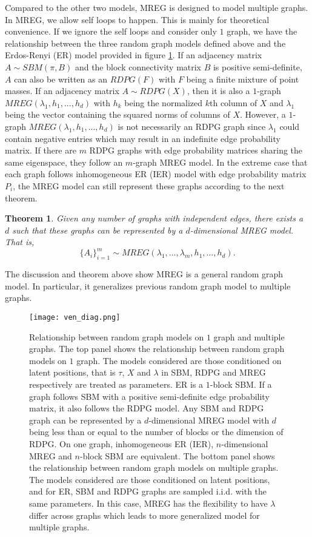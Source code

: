 \documentclass[10pt,journal,compsoc]{IEEEtran}
\newtheorem{theorem}{Theorem}[section]
\begin{document}
\noindent Compared to the other two models, MREG is designed to model multiple graphs. In MREG, we allow self loops to happen. This is mainly for theoretical convenience. If we ignore the self loops and consider only $1$ graph, we have the relationship between the three random graph models defined above and the Erdos-Renyi (ER) model provided in figure \ref{fig:ven}. If an adjacency matrix $A \sim SBM(\pi,B)$ and the block connectivity matrix $B$ is positive semi-definite, $A$ can also be written as an $RDPG(F)$ with $F$ being a finite mixture of point masses. If an adjacency matrix $A \sim RDPG(X)$, then it is also a $1$-graph $MREG(\lambda_1,h_1,...,h_d)$ with $h_k$ being the normalized $k$th column of $X$ and $\lambda_1$ being the vector containing the squared norms of columns of $X$. However, a $1$-graph $MREG(\lambda_1,h_1,...,h_d)$ is not necessarily an RDPG graph since $\lambda_1$ could contain negative entries which may result in an indefinite edge probability matrix. If there are $m$ RDPG graphs with edge probability matrices sharing the same eigenspace, they follow an $m$-graph MREG model. In the extreme case that each graph follows inhomogeneous ER (IER) model with edge probability matrix $P_i$, the MREG model can still represent these graphs according to the next theorem.
\begin{theorem}
	Given any number of graphs with independent edges, there exists a $d$ such that these graphs can be represented by a $d$-dimensional MREG model. That is, 
	\[\{A_i\}_{i=1}^{m} \sim MREG(\lambda_1,...,\lambda_m,h_1,...,h_d).\] 
\end{theorem}
The discussion and theorem above show MREG is a general random graph model. In particular, it generalizes previous random graph model to multiple graphs. 

\begin{figure}[!htbp]
	\centering
	\texttt{[image: ven\_diag.png]}
	\caption{Relationship between random graph models on $1$ graph and multiple graphs. The top panel shows the relationship between random graph models on $1$ graph. The models considered are those conditioned on latent positions, that is $\tau$, $X$ and $\lambda$ in SBM, RDPG and MREG respectively are treated as parameters. ER is a $1$-block SBM. If a graph follows SBM with a positive semi-definite edge probability matrix, it also follows the RDPG model. Any  SBM and  RDPG graph can be represented by a $d$-dimensional MREG model with $d$ being less than or equal to the number of blocks or the dimension of RDPG. On one graph, inhomogeneous ER (IER), $n$-dimensional MREG and $n$-block SBM are equivalent. The bottom panel shows the relationship between random graph models on multiple graphs. The models considered are those conditioned on latent positions, and for ER, SBM and RDPG graphs are sampled i.i.d. with the same parameters. In this case, MREG has the flexibility to have $\lambda$ differ across graphs which leads to more generalized model for multiple graphs.}
	\label{fig:ven}
\end{figure}
\end{document}
